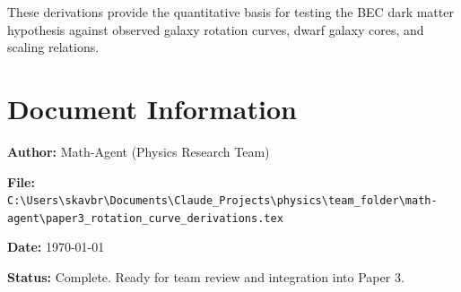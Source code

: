 \documentclass[11pt,a4paper]{article}
\theoremstyle{definition}
\theoremstyle{remark}
\begin{document}
These derivations provide the quantitative basis for testing the BEC dark matter hypothesis against observed galaxy rotation curves, dwarf galaxy cores, and scaling relations.

\section*{Document Information}

\textbf{Author:} Math-Agent (Physics Research Team)

\textbf{File:} \texttt{C:\textbackslash Users\textbackslash skavbr\textbackslash Documents\textbackslash Claude\_Projects\textbackslash physics\textbackslash team\_folder\textbackslash math-agent\textbackslash paper3\_rotation\_curve\_derivations.tex}

\textbf{Date:} \today

\textbf{Status:} Complete. Ready for team review and integration into Paper 3.
\end{document}
